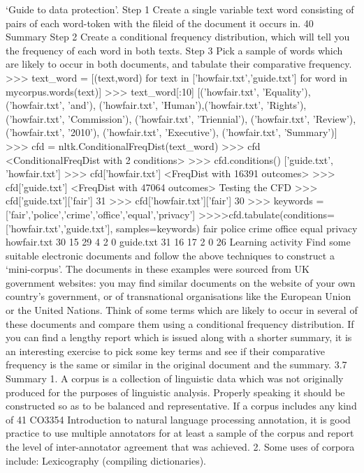 ‘Guide to data protection’.
Step 1 Create a single variable text word consisting of pairs of each word-token
with the fileid of the document it occurs in.
40
Summary
Step 2 Create a conditional frequency distribution, which will tell you the frequency
of each word in both texts.
Step 3 Pick a sample of words which are likely to occur in both documents, and
tabulate their comparative frequency.
>>> text_word = [(text,word) for text in ['howfair.txt','guide.txt']
for word in mycorpus.words(text)]
>>> text_word[:10]
[('howfair.txt', 'Equality'), ('howfair.txt', 'and'),
('howfair.txt', 'Human'),('howfair.txt', 'Rights'),
('howfair.txt', 'Commission'), ('howfair.txt', 'Triennial'),
('howfair.txt', 'Review'), ('howfair.txt', '2010'),
('howfair.txt', 'Executive'),
('howfair.txt', 'Summary')]
>>> cfd = nltk.ConditionalFreqDist(text_word)
>>> cfd
<ConditionalFreqDist with 2 conditions>
>>> cfd.conditions()
['guide.txt', 'howfair.txt']
>>> cfd['howfair.txt']
<FreqDist with 16391 outcomes>
>>> cfd['guide.txt']
<FreqDist with 47064 outcomes>
Testing the CFD
>>> cfd['guide.txt']['fair']
31
>>> cfd['howfair.txt']['fair']
30
>>> keywords = ['fair','police','crime','office','equal','privacy']
>>>>cfd.tabulate(conditions=['howfair.txt','guide.txt'],
samples=keywords)
fair police crime office equal privacy
howfair.txt 30 15 29 4 2 0
guide.txt 31 16 17 2 0 26
Learning activity
Find some suitable electronic documents and follow the above techniques to construct a ‘mini-corpus’. The
documents in these examples were sourced from UK government websites: you may find similar
documents on the website of your own country’s government, or of transnational organisations like the
European Union or the United Nations. Think of some terms which are likely to occur in several of these
documents and compare them using a conditional frequency distribution. If you can find a lengthy report
which is issued along with a shorter summary, it is an interesting exercise to pick some key terms and see if
their comparative frequency is the same or similar in the original document and the summary.
3.7 Summary
1. A corpus is a collection of linguistic data which was not originally produced for
the purposes of linguistic analysis. Properly speaking it should be constructed so
as to be balanced and representative. If a corpus includes any kind of
41
CO3354 Introduction to natural language processing
annotation, it is good practice to use multiple annotators for at least a sample of
the corpus and report the level of inter-annotator agreement that was
achieved.
2. Some uses of corpora include:
Lexicography (compiling dictionaries).
